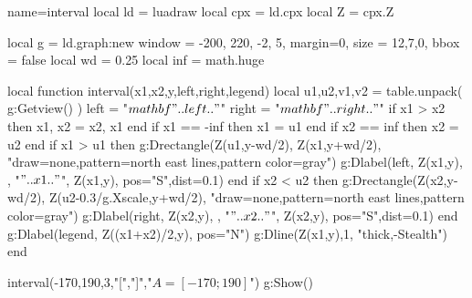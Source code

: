 \documentclass[border=5mm]{standalone}
\begin{document}
\begin{luadraw}{name=interval}
local ld = luadraw
local cpx = ld.cpx
local Z = cpx.Z

local g = ld.graph:new{ window = {-200, 220, -2, 5}, margin=0, size = {12,7,0}, bbox = false }
local wd = 0.25
local inf = math.huge

local function interval(x1,x2,y,left,right,legend)
    local u1,u2,v1,v2 = table.unpack( g:Getview() )
    left = "$\\mathbf{"..left.."}$"
    right = "$\\mathbf{"..right.."}$"
    if x1 > x2 then x1, x2 = x2, x1 end
    if x1 == -inf then x1 = u1 end
    if x2 == inf then x2 = u2 end
    if x1 > u1 then
        g:Drectangle(Z(u1,y-wd/2), Z(x1,y+wd/2), "draw=none,pattern=north east lines,pattern color=gray")
        g:Dlabel(left, Z(x1,y), {}, "$"..x1.."$", Z(x1,y), {pos="S",dist=0.1})
    end
    if x2 < u2 then
        g:Drectangle(Z(x2,y-wd/2), Z(u2-0.3/g.Xscale,y+wd/2), "draw=none,pattern=north east lines,pattern color=gray")
        g:Dlabel(right, Z(x2,y), {}, "$"..x2.."$", Z(x2,y), {pos="S",dist=0.1})
    end
    g:Dlabel(legend, Z((x1+x2)/2,y), {pos="N"})
    g:Dline({Z(x1,y),1}, "thick,-Stealth")
end

interval(-170,190,3,"[","]","$A = [-170; 190]$")
g:Show()
\end{luadraw}
\end{document}
